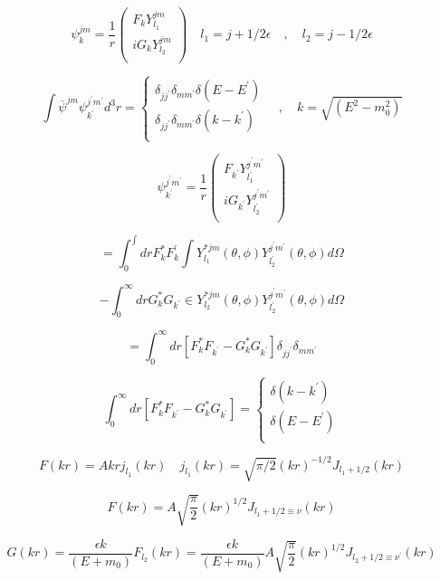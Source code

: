 \documentclass{report}
\begin{document}
\[\psi _{k}^{jm} = \frac{1}{r} \left ( \begin{array}{cc}
  F_k Y_{l_{1}}^{jm}  \\
  iG_k Y_{l_{2}}^{jm}  \\
 \end{array} \right) \quad l_{1} = j+1/2 \epsilon \quad , \quad l_2 = j-1/2 \epsilon  \]

\[\int \overline{\psi}^{jm} \psi _{k^{\prime}}^{j^{\prime}m^{\prime}} d^{3}r = \begin{cases}
    \delta_{jj^{\prime}} \delta_{mm^{\prime}} \delta(E-E^{\prime})\\
    \delta_{jj^{\prime}} \delta_{mm^{\prime}} \delta(k-k^{\prime}) \\
  \end{cases} \quad , \quad k = \sqrt{(E^{2}-m_{0}^{2})}\]

\[\psi_{k^{\prime}}^{j^{\prime}m^{\prime}} = \frac{1}{r} \left ( \begin{array}{cc}
  F_{k^{\prime}} Y_{l_{1}^{\prime}}^{j^{\prime}m^{\prime}}  \\
  iG_{k^{\prime}} Y_{l_{2}^{\prime}}^{j^{\prime}m^{\prime}}  \\
 \end{array} \right) \]

\[= \int _{0}^{\int} dr F_{k}^{*} F_{k}^{\prime} \int Y_{l_{1}}^{*jm} (\theta , \phi) Y_{l_{2}^{\prime}}^{j^{\prime}m^{\prime}} (\theta , \phi ) d \Omega\]

\[- \int _{0}^{\infty} dr G_{k}^{*}G_{k^{\prime}} \in Y_{l_{2}}^{*jm} (\theta , \phi ) Y_{l_{2}^{\prime}}^{j^{\prime}m^{\prime}} (\theta , \phi ) d \Omega \]

\[= \int _{0}^{\infty} dr [F_k ^* F_{k^{\prime}} - G_{k}^{*}G_{k^{\prime}}] \delta _{jj^{\prime}} \delta _{mm^{\prime }}\]

\[\int_{0}^{\infty} dr [F_{k}^{*}F_{k^{\prime}}- G_{k}^{*}G_{k^{\prime}}] = \begin{cases}
    \delta(k-k^{\prime})\\
    \delta(E-E^{\prime}) \\
  \end{cases} \]

\[F(kr)=Akr j_{l_{1}}(kr) \quad j_{l_{1}}(kr)=\sqrt{\pi/2} (kr)^{-1/2}J_{l_{1}+1/2}(kr)\]

\[F(kr) = A \sqrt{\frac{\pi}{2}}(kr)^{1/2} J_{l_{1}+1/2 \equiv \nu} (kr)\]

\[G(kr) = \frac{\epsilon k}{(E+m_0 )} F_{l_{2}}(kr) = \frac{\epsilon k}{(E+m_0 )}A \sqrt{\frac{\pi}{2}}(kr)^{1/2} J_{l_{2}+1/2 \equiv \nu ^{\prime}} (kr)\]
\end{document}

